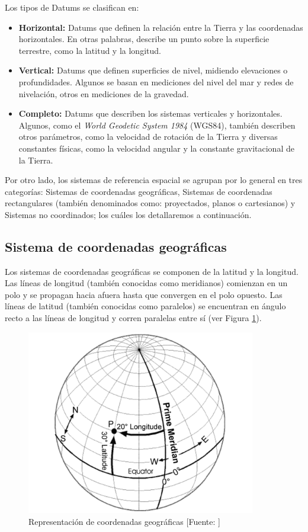 Los tipos de Datums se clasifican en:
\begin{itemize}
    \item \textbf{Horizontal:} 
    Datums que definen la relación entre la Tierra y las coordenadas horizontales. En otras palabras, describe un punto sobre la superficie terrestre, como la latitud y la longitud.
    \item \textbf{Vertical:} 
    Datums que definen superficies de nivel, midiendo elevaciones o profundidades. Algunos se basan en mediciones del nivel del mar y redes de nivelación, otros en mediciones de la gravedad.
    \item \textbf{Completo:} 
    Datums que describen los sistemas verticales y horizontales. Algunos, como el \textit{World Geodetic System 1984} (WGS84), también describen otros parámetros, como la velocidad de rotación de la Tierra y diversas constantes físicas, como la velocidad angular y la constante gravitacional de la Tierra.
\end{itemize}

Por otro lado, los sistemas de referencia espacial se agrupan por lo general en tres categorías: Sistemas de coordenadas geográficas, Sistemas de coordenadas rectangulares (también denominados como: proyectados, planos o cartesianos) y Sistemas no coordinados; los cuáles los detallaremos a continuación.

\subsection{Sistema de coordenadas geográficas}
Los sistemas de coordenadas geográficas se componen de la latitud y la longitud. Las líneas de longitud (también conocidas como meridianos) comienzan en un polo y se propagan hacia afuera hasta que convergen en el polo opuesto. Las líneas de latitud (también conocidas como paralelos) se encuentran en ángulo recto a las líneas de longitud y corren paralelas entre sí (ver Figura \ref{fig:latitudLongitud}). 

\begin{figure}[H]
    \centering
    \includegraphics[width=10cm]{CoordenadasGeograficas.png}
    \caption{Representación de coordenadas geográficas [Fuente: ]}
    \label{fig:latitudLongitud}
\end{figure}

